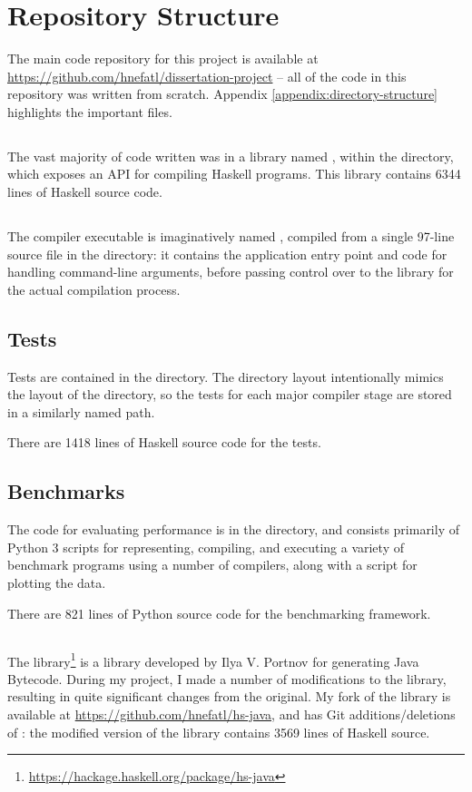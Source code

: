 \documentclass[dissertation.tex]{subfiles}
\begin{document}
\section{Repository Structure}
{
    The main code repository for this project is available at \url{https://github.com/hnefatl/dissertation-project} -- all of the code in this repository was written from scratch. Appendix \ref{appendix:directory-structure} highlights the important files.

    \subsection{}
    {
        The vast majority of code written was in a library named , within the  directory, which exposes an API for compiling Haskell programs. This library contains 6344 lines of Haskell source code.
    }
    \subsection{}
    {
        The compiler executable is imaginatively named , compiled from a single 97-line source file  in the  directory: it contains the application entry point and code for handling command-line arguments, before passing control over to the  library for the actual compilation process.
    }
    \subsection{Tests}
    {
        Tests are contained in the  directory. The directory layout intentionally mimics the layout of the  directory, so the tests for each major compiler stage are stored in a similarly named path.

        There are 1418 lines of Haskell source code for the tests.
    }
    \subsection{Benchmarks}
    {
        The code for evaluating performance is in the  directory, and consists primarily of Python 3 scripts for representing, compiling, and executing a variety of benchmark programs using a number of compilers, along with a script for plotting the data.

        There are 821 lines of Python source code for the benchmarking framework.
    }
    \subsection{}
    {
        The  library\footnote{\url{https://hackage.haskell.org/package/hs-java}} is a library developed by Ilya V. Portnov for generating Java Bytecode. During my project, I made a number of modifications to the library, resulting in quite significant changes from the original. My fork of the library is available at \url{https://github.com/hnefatl/hs-java}, and has Git additions/deletions of : the modified version of the library contains 3569 lines of Haskell source.
    }
}
\end{document}
